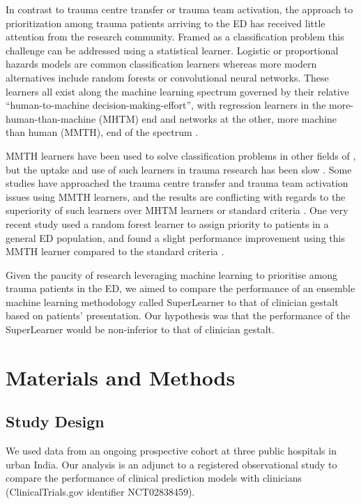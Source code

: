 \documentclass[10pt,letterpaper]{article}\usepackage[]{graphicx}\usepackage[]{color}
\begin{document}
In contrast to trauma centre transfer or trauma team activation, the approach to
prioritization among trauma patients arriving to the ED has received little
attention from the research community. Framed as a classification problem this
challenge can be addressed using a statistical learner. Logistic or proportional
hazards models are common classification learners whereas more modern
alternatives include random forests or convolutional neural networks. These
learners all exist along the machine learning spectrum governed by their
relative ``human-to-machine decision-making-effort'', with regression learners
in the more-human-than-machine (MHTM) end and networks at the other, more
machine than human (MMTH), end of the spectrum \cite{Beam2018}.

MMTH learners have been used to solve classification problems in other fields of
\cite{Nevin2018}, but the uptake and use of such learners in trauma research has
been slow \cite{Liu2017}. Some studies have approached the trauma centre
transfer and trauma team activation issues using MMTH learners, and the results
are conflicting with regards to the superiority of such learners over MHTM
learners or standard criteria
\cite{Talbert2007,Pearl2008,Scerbo2014,Follin2016}. One very recent study used a
random forest learner to assign priority to patients in a general ED population,
and found a slight performance improvement using this MMTH learner compared to
the standard criteria \cite{Levin2018}.

Given the paucity of research leveraging machine learning to prioritise among
trauma patients in the ED, we aimed to compare the performance of an ensemble
machine learning methodology called SuperLearner to that of clinician gestalt
based on patients’ presentation. Our hypothesis was that the performance of the
SuperLearner would be non-inferior to that of clinician gestalt.

\section*{Materials and Methods}
\subsection*{Study Design}
We used data from an ongoing prospective cohort at three public hospitals in
urban India. Our analysis is an adjunct to a registered observational study to
compare the performance of clinical prediction models with clinicians
(ClinicalTrials.gov identifier NCT02838459).
\end{document}
